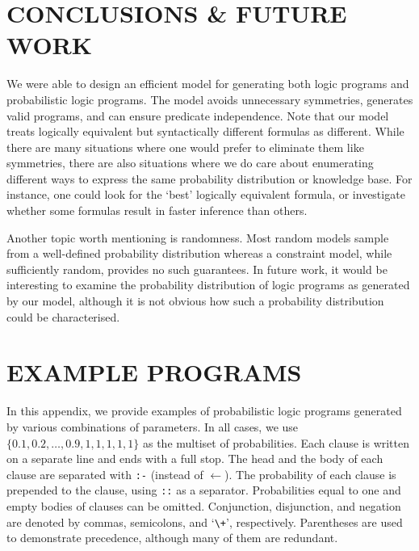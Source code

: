 \documentclass[letterpaper]{article}
\theoremstyle{definition}
\begin{document}
\section{CONCLUSIONS \& FUTURE WORK}

We were able to design an efficient model for generating both logic programs and
probabilistic logic programs. The model avoids unnecessary symmetries, generates
valid programs, and can ensure predicate independence. Note that our model
treats logically equivalent but syntactically different formulas as different.
While there are many situations where one would prefer to eliminate them like
symmetries, there are also situations where we do care about enumerating
different ways to express the same probability distribution or knowledge base.
For instance, one could look for the `best' logically equivalent formula, or
investigate whether some formulas result in faster inference than others.

Another topic worth mentioning is randomness. Most random models sample from a
well-defined probability distribution whereas a constraint model, while
sufficiently random, provides no such guarantees. In future work, it would be
interesting to examine the probability distribution of logic programs as
generated by our model, although it is not obvious how such a probability
distribution could be characterised.



\renewcommand{\bibsection}{\subsubsection*{References}}


\appendix
\section{EXAMPLE PROGRAMS}

In this appendix, we provide examples of probabilistic logic programs generated
by various combinations of parameters. In all cases, we use $\{ 0.1, 0.2, \dots,
0.9, 1, 1, 1, 1, 1\}$ as the multiset of probabilities. Each clause is written
on a separate line and ends with a full stop. The head and the body of each
clause are separated with \texttt{:-} (instead of $\gets$). The probability of
each clause is prepended to the clause, using \texttt{::} as a separator.
Probabilities equal to one and empty bodies of clauses can be omitted.
Conjunction, disjunction, and negation are denoted by commas, semicolons, and
`\texttt{\textbackslash+}', respectively. Parentheses are used to demonstrate
precedence, although many of them are redundant. 
\end{document}
